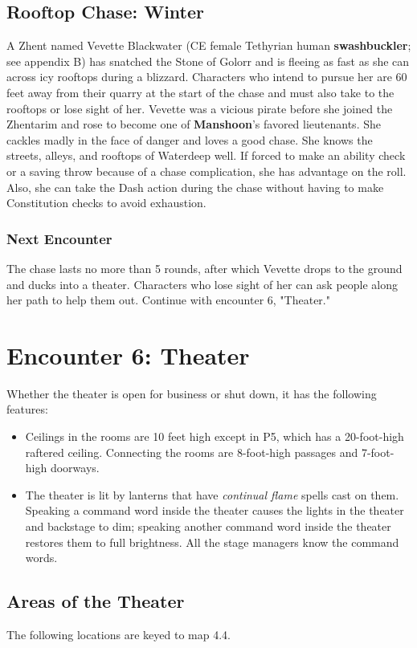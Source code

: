 \documentclass[10pt,a4paper,twoside,twocolumn,openany,nodeprecatedcode]{dndbook}
\begin{document}
\subsection{Rooftop Chase: Winter}
A Zhent named Vevette Blackwater (CE female Tethyrian human \textbf{swashbuckler}; see appendix B) has snatched the Stone of Golorr and is fleeing as fast as she can across icy rooftops during a blizzard. Characters who intend to pursue her are 60 feet away from their quarry at the start of the chase and must also take to the rooftops or lose sight of her.
Vevette was a vicious pirate before she joined the Zhentarim and rose to become one of \textbf{Manshoon}'s favored lieutenants. She cackles madly in the face of danger and loves a good chase. She knows the streets, alleys, and rooftops of Waterdeep well. If forced to make an ability check or a saving throw because of a chase complication, she has advantage on the roll. Also, she can take the Dash action during the chase without having to make Constitution checks to avoid exhaustion.
\subsubsection{Next Encounter}
The chase lasts no more than 5 rounds, after which Vevette drops to the ground and ducks into a theater. Characters who lose sight of her can ask people along her path to help them out. Continue with encounter 6, "Theater."
\section{Encounter 6: Theater}
Whether the theater is open for business or shut down, it has the following features:
\begin{itemize}

\item Ceilings in the rooms are 10 feet high except in P5, which has a 20-foot-high raftered ceiling. Connecting the rooms are 8-foot-high passages and 7-foot-high doorways.
\item The theater is lit by lanterns that have \textit{continual flame} spells cast on them. Speaking a command word inside the theater causes the lights in the theater and backstage to dim; speaking another command word inside the theater restores them to full brightness. All the stage managers know the command words.
\end{itemize}


\subsection{Areas of the Theater}
The following locations are keyed to map 4.4.
\end{document}

